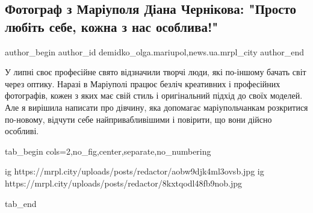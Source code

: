  
 
 
 
 
 
\subsection{Фотограф з Маріуполя Діана Чернікова: "Просто любіть себе, кожна з нас особлива!"}
\label{sec:23_07_2020.stz.news.ua.mrpl_city.1.diana_chernikova_fotograf}
 
\ifcmt
 author_begin
   author_id demidko_olga.mariupol,news.ua.mrpl_city
 author_end
\fi

У липні своє професійне свято відзначили творчі люди, які по-іншому бачать світ
через оптику. Наразі в Маріуполі працює безліч креативних і професійних
фотографів, кожен з яких має свій стиль і оригінальний підхід до своїх моделей.
Але я вирішила написати про дівчину, яка допомагає маріупольчанкам розкритися
по-новому, відчути себе найпривабливішими і повірити, що вони дійсно особливі.


\ifcmt
  tab_begin cols=2,no_fig,center,separate,no_numbering

  ig https://mrpl.city/uploads/posts/redactor/aobw9djk4ml3ovsb.jpg
  ig https://mrpl.city/uploads/posts/redactor/8kxtqodl48fb9nob.jpg

  tab_end
\fi

